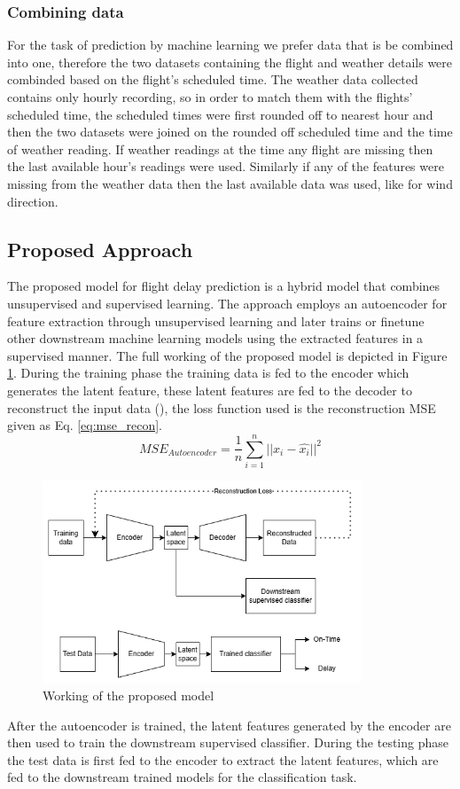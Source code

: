 \documentclass[twoside,11pt]{article}
\begin{document}
\subsubsection{Combining data}
For the task of prediction by machine learning we prefer data that is be combined into one, therefore the two datasets containing the flight and weather details were combinded based on the flight's scheduled time. The weather data collected contains only hourly recording, so in order to match them with the flights' scheduled time, the scheduled times were first rounded off to nearest hour and then the two datasets were joined on the rounded off scheduled time and the time of weather reading. If weather readings at the time any flight are missing then the last available hour's readings were used. Similarly if any of the features were missing from the weather data then the last available data was used, like for wind direction.

\subsection{Proposed Approach}
The proposed model for flight delay prediction is a hybrid model that combines unsupervised and supervised learning. The approach employs an autoencoder for feature extraction through unsupervised learning and later trains or finetune other downstream machine learning models using the extracted features in a supervised manner. The full working of the proposed model is depicted in Figure \ref{fig:model}. During the training phase the training data is fed to the encoder which generates the latent feature, these latent features are fed to the decoder to reconstruct the input data (\citealp{hintonReducingDimensionalityData2006}), the loss function used is the reconstruction MSE given as Eq. \ref{eq:mse_recon}. 
\begin{equation}
  \label{eq:mse_recon}
  MSE_{Autoencoder} = \frac{1}{n} \sum_{i=1}^{n} ||x_i - \hat{x_i}||^2
\end{equation}
\begin{figure}
  \centering
  \includegraphics[width=0.85\textwidth]{images/model.png}
  \caption{Working of the proposed model}
  \label{fig:model}
\end{figure}
After the autoencoder is trained, the latent features generated by the encoder are then used to train the downstream supervised classifier. During the testing phase the test data is first fed to the encoder to extract the latent features, which are fed to the downstream trained models for the classification task.
\end{document}
